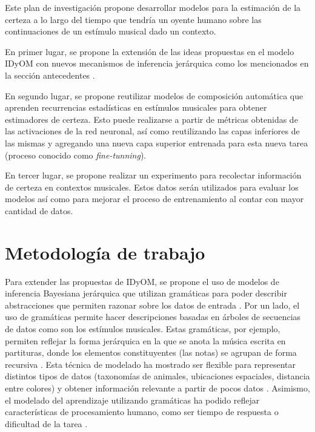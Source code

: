 \documentclass[a4paper,11pt]{article}
\begin{document}
Este plan de investigación propone desarrollar modelos para la estimación de la
certeza a lo largo del tiempo que tendría un oyente humano sobre las
continuaciones de un estímulo musical dado un contexto.

En primer lugar, se propone la extensión de las ideas propuestas en el
modelo IDyOM \cite{pearce2005construction} con nuevos mecanismos de inferencia
jerárquica como los mencionados en la sección antecedentes
\cite{dehaene2015neural}. 

En segundo lugar, se propone reutilizar modelos de composición automática que
aprenden recurrencias estadísticas en estímulos musicales para obtener
estimadores de certeza. Esto puede realizarse a partir de métricas obtenidas de
las activaciones de la red neuronal, así como reutilizando las capas inferiores
de las mismas y agregando una nueva capa superior entrenada para esta nueva
tarea (proceso conocido como \emph{fine-tunning}).

En tercer lugar, se propone realizar un experimento para recolectar información
de certeza en contextos musicales. Estos datos serán utilizados para evaluar
los modelos así como para mejorar el proceso de entrenamiento al contar con
mayor cantidad de datos.

\section*{Metodología de trabajo}

Para extender las propuestas de IDyOM, se propone el uso de modelos de
inferencia Bayesiana jerárquica que utilizan gramáticas para poder describir
abstracciones que permiten razonar sobre los datos de entrada
\cite{tenenbaum2011grow}. Por un lado, el uso de gramáticas permite hacer
descripciones basadas en árboles de secuencias de datos como son los estímulos
musicales. Estas gramáticas, por ejemplo, permiten reflejar la forma jerárquica
en la que se anota la música escrita en partituras, donde los elementos
constituyentes (las notas) se agrupan de forma recursiva
\cite{fitch2013meter-vs-pulse}.
Esta técnica de modelado ha mostrado ser flexible para representar distintos
tipos de datos (taxonomías de animales, ubicaciones espaciales, distancia entre
colores) y obtener información relevante a partir de pocos datos
\cite{tenenbaum2011grow}. Asimismo, el modelado del aprendizaje utilizando
gramáticas ha podido reflejar características de procesamiento humano, como ser
tiempo de respuesta o dificultad de la tarea \cite{tano2018learning}.
\end{document}
